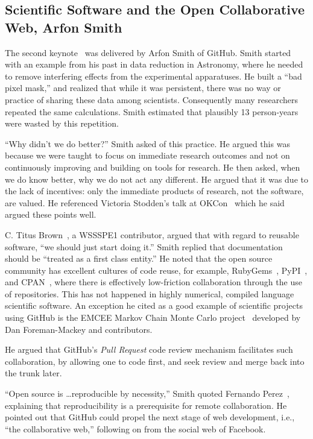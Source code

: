 \documentclass[11pt, oneside]{amsart}
\begin{document}
\subsection{Scientific Software and the Open Collaborative Web, Arfon Smith} \label{sec:keynote2}

The second keynote~\cite{WSSSPE1-keynote2} was delivered by Arfon
Smith of GitHub. Smith started with an example from his past in data
reduction in Astronomy, where he needed to remove interfering effects
from the experimental apparatuses. He built a ``bad pixel mask,'' and
realized that while it was persistent, there was no way or practice of
sharing these data among scientists. Consequently many researchers
repeated the same calculations. Smith estimated that plausibly 13 person-years
were wasted by this repetition.

``Why didn't we do better?''  Smith asked of this practice. He argued
this was because we were taught to focus on immediate research
outcomes and not on continuously improving and building on tools for
research. He then asked, when we do know better, why we do not act any
different. He argued that it was due to the lack of incentives: only
the immediate products of research, not the software, are valued.  He
referenced Victoria Stodden's talk at OKCon~\cite{okcon-stodden-talk}
which he said argued these points well.

C. Titus Brown~\cite{ged-web}, a WSSSPE1 contributor, argued that with
regard to reusable software, ``we should just start doing it.''  Smith
replied that documentation should be ``treated as a first class
entity.''  He noted that the open source community has excellent
cultures of code reuse, for example, RubyGems~\cite{rubygems-web},
PyPI~\cite{pypi-web}, and CPAN~\cite{cpan-web}, where there is
effectively low-friction collaboration through the use of
repositories. This has not happened in highly numerical, compiled
language scientific software.  An exception he cited as a good example
of scientific projects using GitHub is the EMCEE Markov Chain Monte
Carlo project~\cite{emcee-web} developed by Dan Foreman-Mackey and contributors.

He argued that GitHub's \emph{Pull Request} code review mechanism
facilitates such collaboration, by allowing one to code first, and
seek review and merge back into the trunk later.

``Open source is \ldots reproducible by necessity,'' Smith quoted
Fernando Perez~\cite{perez-open-src-reproducible}, explaining that
reproducibility is a prerequisite for remote collaboration.  He
pointed out that GitHub could propel the next stage of web
development, i.e., ``the collaborative web,'' following on from the
social web of Facebook.
\end{document}

